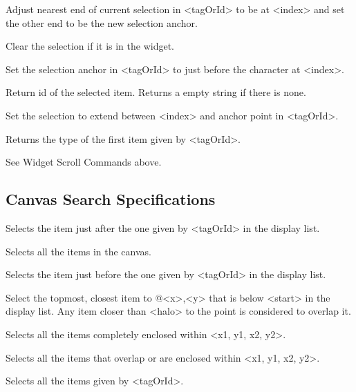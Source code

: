 \begin{enum}{1cm}
Adjust nearest end of current selection in <tagOrId> to be at <index> and
set the other end to be the new selection anchor.

Clear the selection if it is in the widget.

Set the selection anchor in <tagOrId> to just before the character at <index>.

Return id of the selected item. Returns a empty string if there is none.

Set the selection to extend between <index> and anchor point in <tagOrId>.

Returns the type of the first item given by <tagOrId>.

See Widget Scroll Commands above.

\end{enum}


\subsection*{Canvas Search Specifications}
\begin{enum}{1cm}

Selects  the item just after the one given by <tagOrId> in the  display  list.

Selects all the items in the canvas.

Selects  the item just before the one given by <tagOrId> in the  display  list.

Select the topmost, closest item to @<x>,<y> that is below <start> in
the display list. Any item closer than <halo> to the point is
considered to overlap it.

Selects all the items completely enclosed within <x1, y1, x2, y2>.

Selects  all  the  items that overlap or are enclosed within <x1, y1, x2, y2>.

Selects all the items given by <tagOrId>.

\end{enum}
\vskip5pt

